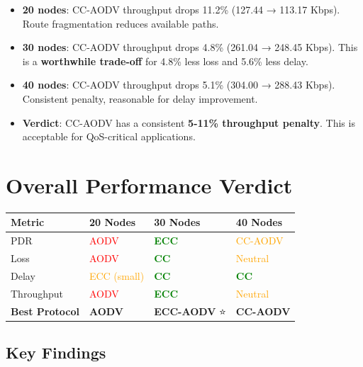 \documentclass[12pt]{article}
\begin{document}
\begin{itemize}
    \item \textbf{20 nodes}: CC-AODV throughput drops 11.2\% (127.44 → 113.17 Kbps). Route fragmentation reduces available paths.
    \item \textbf{30 nodes}: CC-AODV throughput drops 4.8\% (261.04 → 248.45 Kbps). This is a \textbf{worthwhile trade-off} for 4.8\% less loss and 5.6\% less delay.
    \item \textbf{40 nodes}: CC-AODV throughput drops 5.1\% (304.00 → 288.43 Kbps). Consistent penalty, reasonable for delay improvement.
    \item \textbf{Verdict}: CC-AODV has a consistent \textbf{5-11\% throughput penalty}. This is acceptable for QoS-critical applications.
\end{itemize}

\pagebreak

\section*{Overall Performance Verdict}

\begin{center}
\begin{tabular}{llll}
\toprule
\textbf{Metric} & \textbf{20 Nodes} & \textbf{30 Nodes} & \textbf{40 Nodes} \\
\midrule
PDR & \textcolor{red}{AODV} & \textcolor{green}{\textbf{ECC}} & \textcolor{orange}{CC-AODV} \\
Loss & \textcolor{red}{AODV} & \textcolor{green}{\textbf{CC}} & \textcolor{orange}{Neutral} \\
Delay & \textcolor{orange}{ECC (small)} & \textcolor{green}{\textbf{CC}} & \textcolor{green}{\textbf{CC}} \\
Throughput & \textcolor{red}{AODV} & \textcolor{green}{\textbf{ECC}} & \textcolor{orange}{Neutral} \\
\midrule
\textbf{Best Protocol} & \textbf{AODV} & \textbf{ECC-AODV} ⭐ & \textbf{CC-AODV} \\
\bottomrule
\end{tabular}
\end{center}

\subsection*{Key Findings}
\end{document}
